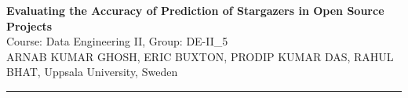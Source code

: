\documentclass[11pt,a4paper]{article}
\begin{document}
\begin{center}
  {\LARGE\bfseries Evaluating the Accuracy of Prediction of Stargazers in Open Source Projects\\[0.9em]}
  {\large Course: Data Engineering II, \large Group: DE-II\_5\\[.4cm]}
  {\normalsize
   ARNAB KUMAR GHOSH, ERIC BUXTON, PRODIP KUMAR DAS, RAHUL BHAT, Uppsala University, Sweden}
\end{center}
\noindent\rule{\textwidth}{0.4pt}







\vspace{-0.1em}
\vspace{-0.5em}

\printbibliography
\end{document}
